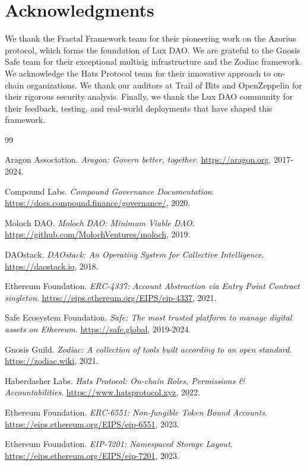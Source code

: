 \section*{Acknowledgments}


We thank the Fractal Framework team for their pioneering work on the Azorius protocol, which forms the foundation of Lux DAO. We are grateful to the Gnosis Safe team for their exceptional multisig infrastructure and the Zodiac framework. We acknowledge the Hats Protocol team for their innovative approach to on-chain organizations. We thank our auditors at Trail of Bits and OpenZeppelin for their rigorous security analysis. Finally, we thank the Lux DAO community for their feedback, testing, and real-world deployments that have shaped this framework.

\begin{thebibliography}{99}

Aragon Association.
\textit{Aragon: Govern better, together}.
\url{https://aragon.org}, 2017-2024.

Compound Labs.
\textit{Compound Governance Documentation}.
\url{https://docs.compound.finance/governance/}, 2020.

Moloch DAO.
\textit{Moloch DAO: Minimum Viable DAO}.
\url{https://github.com/MolochVentures/moloch}, 2019.

DAOstack.
\textit{DAOstack: An Operating System for Collective Intelligence}.
\url{https://daostack.io}, 2018.

Ethereum Foundation.
\textit{ERC-4337: Account Abstraction via Entry Point Contract singleton}.
\url{https://eips.ethereum.org/EIPS/eip-4337}, 2021.

Safe Ecosystem Foundation.
\textit{Safe: The most trusted platform to manage digital assets on Ethereum}.
\url{https://safe.global}, 2019-2024.

Gnosis Guild.
\textit{Zodiac: A collection of tools built according to an open standard}.
\url{https://zodiac.wiki}, 2021.

Haberdasher Labs.
\textit{Hats Protocol: On-chain Roles, Permissions \& Accountabilities}.
\url{https://www.hatsprotocol.xyz}, 2022.

Ethereum Foundation.
\textit{ERC-6551: Non-fungible Token Bound Accounts}.
\url{https://eips.ethereum.org/EIPS/eip-6551}, 2023.

Ethereum Foundation.
\textit{EIP-7201: Namespaced Storage Layout}.
\url{https://eips.ethereum.org/EIPS/eip-7201}, 2023.


\end{thebibliography}
